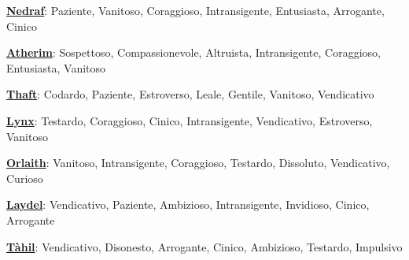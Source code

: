 \begin{multicols}{2}
{\smallskip

\textbf{\hyperlink{nedraf}{Nedraf}}: Paziente, Vanitoso, Coraggioso, Intransigente, Entusiasta, Arrogante, Cinico

\smallskip

\textbf{\hyperlink{atherim}{Atherim}}: Sospettoso, Compassionevole, Altruista, Intransigente, Coraggioso, Entusiasta, Vanitoso\

\smallskip

\textbf{\hyperlink{thaft}{Thaft}}: Codardo, Paziente, Estroverso, Leale, Gentile, Vanitoso, Vendicativo

\smallskip

\textbf{\hyperlink{lynx}{Lynx}}: Testardo, Coraggioso, Cinico, Intransigente, Vendicativo, Estroverso, Vanitoso

\smallskip

\textbf{\hyperlink{orlaith}{Orlaith}}: Vanitoso, Intransigente, Coraggioso, Testardo, Dissoluto, Vendicativo, Curioso

\smallskip

\textbf{\hyperlink{laydel}{Laydel}}: Vendicativo, Paziente, Ambizioso, Intransigente, Invidioso, Cinico, Arrogante

\smallskip

\textbf{\hyperlink{tahil}{Tàhil}}: Vendicativo, Disonesto, Arrogante, Cinico, Ambizioso, Testardo, Impulsivo

}

\end{multicols}






\pagebreak

